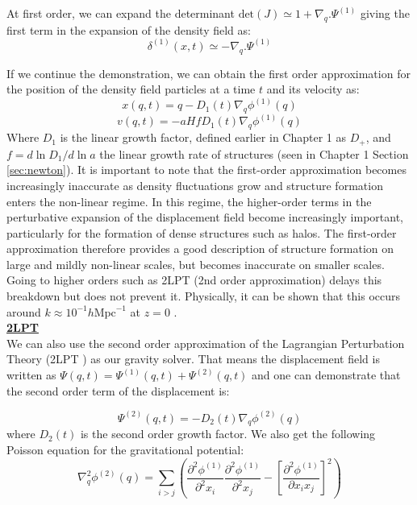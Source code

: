At first order, we can expand the determinant $\text{det}(J) \simeq 1 + \nabla_q . \Psi^{(1)}$ giving the first term in the expansion of the density field as: 
\begin{equation}
    \delta^{(1)}(x,t) \simeq - \nabla_q . \Psi^{(1)}
\end{equation}

If we continue the demonstration, we can obtain the first order approximation for the position of the density field particles at a time $t$ 
and its velocity as: 
\begin{equation}
    \boxed{x(q, t) = q - D_1(t) \nabla_q \phi^{(1)}(q)}
\end{equation}
\begin{equation}
    \boxed{v(q, t) = -a H f D_1(t) \nabla_q \phi^{(1)}(q)}
\end{equation}
Where $D_1$ is the linear growth factor, defined earlier in Chapter 1 as $D_+$, and $f=d \ln D_1 / d \ln a$ the linear growth rate of structures (seen in Chapter 1 Section \ref{sec:newton}). 
It is important to note that the first-order approximation becomes 
increasingly inaccurate as density fluctuations grow and structure formation 
enters the non-linear regime. In this regime, the higher-order terms in the 
perturbative expansion of the displacement field become increasingly 
important, particularly for the formation of dense structures such as halos. 
The first-order approximation therefore provides a good description of 
structure formation on large and mildly non-linear scales, but becomes 
inaccurate on smaller scales. Going to higher orders such as 2LPT (2nd order approximation) delays this breakdown but does not prevent it. Physically, 
it can be shown that this occurs around $k\approx10^{-1} h \text{Mpc}^{-1}$ at $z=0$ \cite{Chan_2014}. \\

\noindent \textbf{\underline{2LPT}} \\

We can also use the second order approximation of the Lagrangian Perturbation Theory (2LPT \cite{Bouchet_1994}) as our gravity solver. That means the displacement field is written as 
$\Psi(q,t) = \Psi^{(1)}(q, t) + \Psi^{(2)}(q, t)$ and one can demonstrate that the second order term of the displacement is: 

\begin{equation}
    \Psi^{(2)}(q,t) = -D_2 (t) \nabla_q \phi^{(2)} (q)
\end{equation}
where $D_2(t)$ is the second order growth factor. We also get the following Poisson equation for the gravitational potential: 
\begin{equation}
    \nabla_q^{2} \phi^{(2)} (q) = \sum_{i>j} \left( \frac{\partial^{2} \phi^{(1)} }{\partial^{2}x_i} \frac{\partial^{2} \phi^{(1)} }{\partial^{2}x_j} - \left[ \frac{\partial^{2} \phi^{(1)} }{\partial x_i x_j} \right]^2 \right)
\end{equation}

